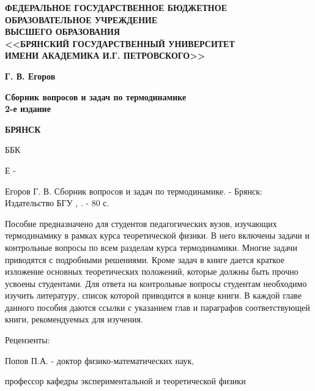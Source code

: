 \documentclass[14pt,a4paper, oneside]{memoir}
\numberwithin{equation}{section} %
\begin{document}
\thispagestyle{empty}
\begin{center}
  \textbf{ФЕДЕРАЛЬНОЕ ГОСУДАРСТВЕННОЕ БЮДЖЕТНОЕ \\ ОБРАЗОВАТЕЛЬНОЕ УЧРЕЖДЕНИЕ \\ ВЫСШЕГО ОБРАЗОВАНИЯ \\
  <<БРЯНСКИЙ ГОСУДАРСТВЕННЫЙ УНИВЕРСИТЕТ \\ ИМЕНИ АКАДЕМИКА И.Г. ПЕТРОВСКОГО>>}
  
  \vspace{0pt plus4fill}
  
  \textbf{\large Г. В. Егоров}

  \vspace{0pt plus1fill}

  \textbf{\Large Сборник вопросов и задач по термодинамике \\ 2-е издание}

  \vspace{0pt plus4fill}

  \textbf{БРЯНСК \the\year}
\end{center}
\clearpage
\tableofcontents
{} %
\clearpage

ББК

Е -

Егоров Г. В. Сборник вопросов и задач по термодинамике. - Брянск:
Издательство БГУ , \the\year. - 80 с.

Пособие предназначено для студентов педагогических вузов, изучающих
термодинамику в рамках курса теоретической физики. В него включены
задачи и контрольные вопросы по всем разделам курса термодинамики.
Многие задачи приводятся с подробными решениями. Кроме задач в книге
дается краткое изложение основных теоретических положений, которые
должны быть прочно усвоены студентами. Для ответа на контрольные вопросы
студентам необходимо изучить литературу, список которой приводится в
конце книги. В каждой главе данного пособия даются ссылки с указанием
глав и параграфов соответствующей книги, рекомендуемых для изучения.

Рецензенты:



Попов П.А. - доктор физико-математических наук,

профессор кафедры экспериментальной и теоретической физики

\end{document}

